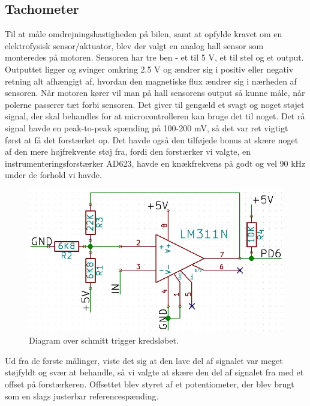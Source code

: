 \subsection{Tachometer}

Til at måle omdrejningshastigheden på bilen, samt at opfylde kravet om en elektrofysisk sensor/aktuator, blev der valgt en analog hall sensor som monteredes på motoren. Sensoren har tre ben - et til 5 V, et til stel og et output. Outputtet ligger og svinger omkring 2.5 V og ændrer sig i positiv eller negativ retning alt afhængigt af, hvordan den magnetiske flux ændrer sig i nærheden af sensoren. Når motoren kører vil man på hall sensorens output så kunne måle, når polerne passerer tæt forbi sensoren. Det giver til gengæld et svagt og noget støjet signal, der skal behandles for at microcontrolleren kan bruge det til noget. Det rå signal havde en peak-to-peak spænding på 100-200 mV, så det var ret vigtigt først at få det forstærket op. Det havde også den tilføjede bonus at skære noget af den mere højfrekvente støj fra, fordi den forstærker vi valgte, en instrumenteringsforstærker AD623, havde en knækfrekvens på godt og vel 90 kHz under de forhold vi havde. 

\begin{figure}[h]

	\centering
		\includegraphics[scale=0.5]{Billeder/Schmitt.jpg}
	\caption{Diagram over schmitt trigger kredsløbet.}
	\label{fig:Distance Check}
	
\end{figure}

Ud fra de første målinger, viste det sig at den lave del af signalet var meget støjfyldt og svær at behandle, så vi valgte at skære den del af signalet fra med et offset på forstærkeren. Offsettet blev styret af et potentiometer, der blev brugt som en slags justerbar referencespænding.

